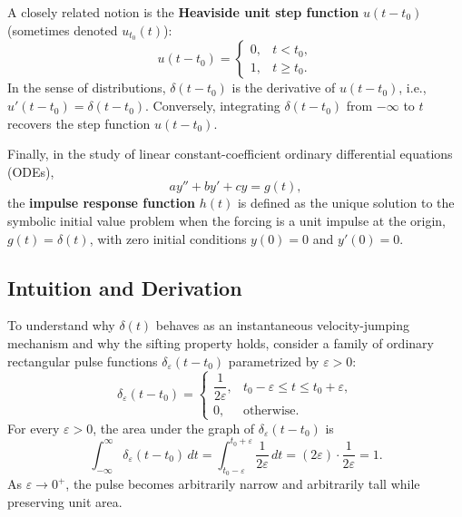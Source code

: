 \documentclass[11pt, letterpaper]{article}
\theoremstyle{definition}
\theoremstyle{remark}
\begin{document}
A closely related notion is the \textbf{Heaviside unit step function} $u(t - t_0)$ (sometimes denoted $u_{t_0}(t)$):
\[
    u(t - t_0) = \begin{cases} 0, & t < t_0, \\ 1, & t \ge t_0. \end{cases}
\]
In the sense of distributions, $\delta(t - t_0)$ is the derivative of $u(t - t_0)$, i.e., $u'(t - t_0) = \delta(t - t_0)$. Conversely, integrating $\delta(t - t_0)$ from $-\infty$ to $t$ recovers the step function $u(t - t_0)$.

Finally, in the study of linear constant-coefficient ordinary differential equations (ODEs),
\[
    a y'' + b y' + c y = g(t),
\]
the \textbf{impulse response function} $h(t)$ is defined as the unique solution to the symbolic initial value problem when the forcing is a unit impulse at the origin, $g(t) = \delta(t)$, with zero initial conditions $y(0) = 0$ and $y'(0) = 0$.

\subsection{Intuition and Derivation}
To understand why $\delta(t)$ behaves as an instantaneous velocity-jumping mechanism and why the sifting property holds, consider a family of ordinary rectangular pulse functions $\delta_\varepsilon(t - t_0)$ parametrized by $\varepsilon > 0$:
\[
    \delta_\varepsilon(t - t_0) = \begin{cases} \dfrac{1}{2\varepsilon}, & t_0 - \varepsilon \le t \le t_0 + \varepsilon, \\[6pt] 0, & \text{otherwise}. \end{cases}
\]
For every $\varepsilon > 0$, the area under the graph of $\delta_\varepsilon(t - t_0)$ is
\[
    \int_{-\infty}^{\infty} \delta_\varepsilon(t - t_0)\,dt = \int_{t_0 - \varepsilon}^{t_0 + \varepsilon} \frac{1}{2\varepsilon}\,dt = (2\varepsilon)\cdot \frac{1}{2\varepsilon} = 1.
\]
As $\varepsilon \to 0^+$, the pulse becomes arbitrarily narrow and arbitrarily tall while preserving unit area.
\end{document}
